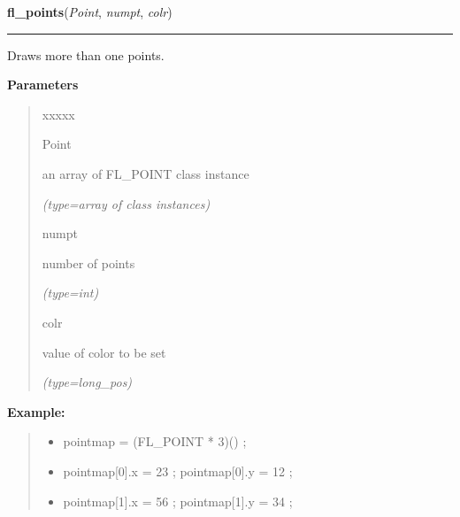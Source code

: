     \vspace{0.5ex}

\hspace{.8\funcindent}\begin{boxedminipage}{\funcwidth}

    \raggedright \textbf{fl\_points}(\textit{Point}, \textit{numpt}, \textit{colr})

    \vspace{-1.5ex}

    \rule{\textwidth}{0.5\fboxrule}
\setlength{\parskip}{2ex}
    Draws more than one points.

\setlength{\parskip}{1ex}
      \textbf{Parameters}
      \vspace{-1ex}

      \begin{quote}
        \begin{Ventry}{xxxxx}

          \item[Point]

          an array of FL\_POINT class instance

            {\it (type=array of class instances)}

          \item[numpt]

          number of points

            {\it (type=int)}

          \item[colr]

          value of color to be set

            {\it (type=long\_pos)}

        \end{Ventry}

      \end{quote}

\textbf{Example:}
\begin{quote}
  \begin{itemize}

  \item
    \setlength{\parskip}{0.6ex}
pointmap = (FL\_POINT * 3)() ;



  \item pointmap[0].x = 23 ; pointmap[0].y = 12 ;



  \item pointmap[1].x = 56 ; pointmap[1].y = 34 ;




\end{itemize}
\end{quote}
\end{boxedminipage}
